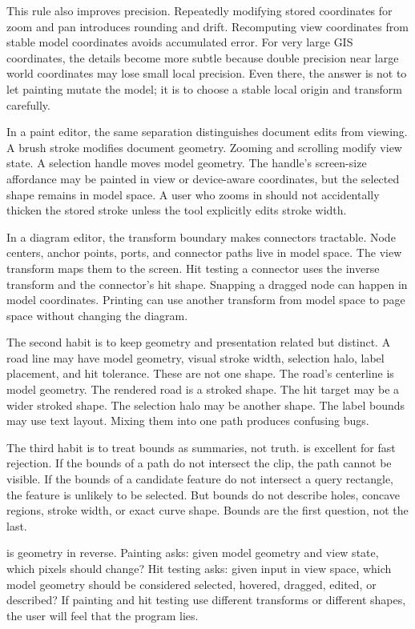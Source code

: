 This rule also improves precision. Repeatedly modifying stored coordinates for zoom and pan introduces rounding and drift. Recomputing view coordinates from stable model coordinates avoids accumulated error. For very large GIS coordinates, the details become more subtle because double precision near large world coordinates may lose small local precision. Even there, the answer is not to let painting mutate the model; it is to choose a stable local origin and transform carefully.

In a paint editor, the same separation distinguishes document edits from viewing. A brush stroke modifies document geometry. Zooming and scrolling modify view state. A selection handle moves model geometry. The handle's screen-size affordance may be painted in view or device-aware coordinates, but the selected shape remains in model space. A user who zooms in should not accidentally thicken the stored stroke unless the tool explicitly edits stroke width.

In a diagram editor, the transform boundary makes connectors tractable. Node centers, anchor points, ports, and connector paths live in model space. The view transform maps them to the screen. Hit testing a connector uses the inverse transform and the connector's hit shape. Snapping a dragged node can happen in model coordinates. Printing can use another transform from model space to page space without changing the diagram.

The second habit is to keep geometry and presentation related but distinct. A road line may have model geometry, visual stroke width, selection halo, label placement, and hit tolerance. These are not one shape. The road's centerline is model geometry. The rendered road is a stroked shape. The hit target may be a wider stroked shape. The selection halo may be another shape. The label bounds may use text layout. Mixing them into one path produces confusing bugs.

The third habit is to treat bounds as summaries, not truth.  is excellent for fast rejection. If the bounds of a path do not intersect the clip, the path cannot be visible. If the bounds of a candidate feature do not intersect a query rectangle, the feature is unlikely to be selected. But bounds do not describe holes, concave regions, stroke width, or exact curve shape. Bounds are the first question, not the last.

 is geometry in reverse. Painting asks: given model geometry and view state, which pixels should change? Hit testing asks: given input in view space, which model geometry should be considered selected, hovered, dragged, edited, or described? If painting and hit testing use different transforms or different shapes, the user will feel that the program lies.

